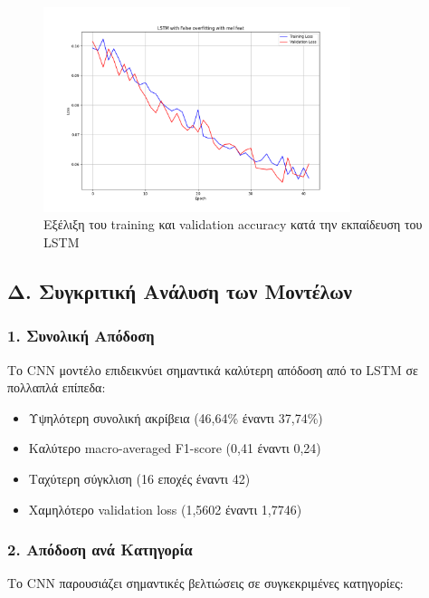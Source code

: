 \documentclass[a4paper,12pt]{article}
\begin{document}
\begin{figure}[h!]
    \centering
    \includegraphics[width=0.8\textwidth]{images/LSTM with False overfitting with mel feat.png}
    \caption{Εξέλιξη του training και validation accuracy κατά την εκπαίδευση του LSTM}
    \label{fig:accuracy_evolution}
\end{figure}

\subsection*{Δ. Συγκριτική Ανάλυση των Μοντέλων}

\subsubsection*{1. Συνολική Απόδοση}
Το CNN μοντέλο επιδεικνύει σημαντικά καλύτερη απόδοση από το LSTM σε πολλαπλά επίπεδα:

\begin{itemize}
    \item Υψηλότερη συνολική ακρίβεια (46,64\% έναντι 37,74\%)
    \item Καλύτερο macro-averaged F1-score (0,41 έναντι 0,24)
    \item Ταχύτερη σύγκλιση (16 εποχές έναντι 42)
    \item Χαμηλότερο validation loss (1,5602 έναντι 1,7746)
\end{itemize}

\subsubsection*{2. Απόδοση ανά Κατηγορία}
Το CNN παρουσιάζει σημαντικές βελτιώσεις σε συγκεκριμένες κατηγορίες:
\end{document}
